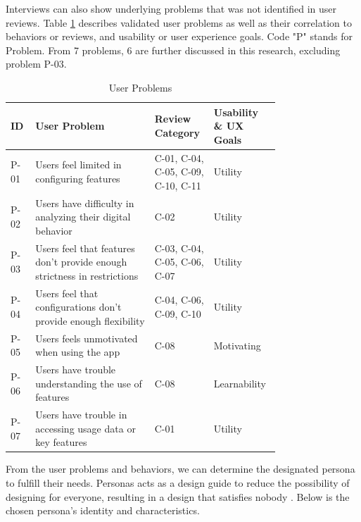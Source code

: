 \documentclass[conference]{IEEEtran}
\begin{document}
Interviews can also show underlying problems that was not identified in user reviews. Table \ref{tab:problems} describes validated user problems as well as their correlation to behaviors or reviews, and usability or user experience goals. Code "P" stands for Problem. From 7 problems, 6 are further discussed in this research, excluding problem P-03.

\RaggedLeft
\begin{table}[htbp]
  \caption{User Problems}
  \begin{footnotesize}
    \begin{center}
      \begin{tabular}{|m{0.07\linewidth}|m{0.4\linewidth}|m{0.14\linewidth}|m{0.15\linewidth}|}
        \hline
      \centering\textbf{ID} & \textbf{User Problem} & \textbf{Review Category} & \textbf{Usability \& UX Goals}\\ \hline
      \centering P-01  & Users feel limited in configuring features & C-01, C-04, C-05, C-09, C-10, C-11 & Utility \\ \hline
      \centering P-02  & Users have difficulty in analyzing their digital behavior & C-02 & Utility \\ \hline
      \centering P-03  & Users feel that features don't provide enough strictness in restrictions\ & C-03, C-04, C-05, C-06, C-07 & Utility \\ \hline
      \centering P-04  & Users feel that configurations don't provide enough flexibility & C-04, C-06, C-09, C-10 & Utility\\ \hline
      \centering P-05  & Users feels unmotivated when using the app & C-08 & Motivating \\ \hline
      \centering P-06  & Users have trouble understanding the use of features & C-08 & Learnability \\ \hline
      \centering P-07  & Users have trouble in accessing usage data or key features & C-01 & Utility \\ \hline
    \end{tabular}
    \label{tab:problems}
  \end{center}
\end{footnotesize}
\end{table}
\justifying

From the user problems and behaviors, we can determine the designated persona to fulfill their needs. Personas acts as a design guide to reduce the possibility of designing for everyone, resulting in a design that satisfies nobody \cite{cooper2014face}. Below is the chosen persona's identity and characteristics.
\end{document}
